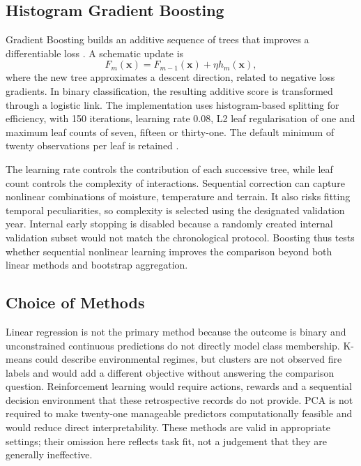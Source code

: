 \documentclass[conference,a4paper]{IEEEtran}
\begin{document}
\subsection{Histogram Gradient Boosting}
Gradient Boosting builds an additive sequence of trees that improves a differentiable loss \citep{friedman}. A schematic update is
\begin{equation}
F_m(\mathbf x)=F_{m-1}(\mathbf x)+\eta h_m(\mathbf x),
\end{equation}
where the new tree approximates a descent direction, related to negative loss gradients. In binary classification, the resulting additive score is transformed through a logistic link. The implementation uses histogram-based splitting for efficiency, with 150 iterations, learning rate 0.08, L2 leaf regularisation of one and maximum leaf counts of seven, fifteen or thirty-one. The default minimum of twenty observations per leaf is retained \citep{sklearnboost}.

The learning rate controls the contribution of each successive tree, while leaf count controls the complexity of interactions. Sequential correction can capture nonlinear combinations of moisture, temperature and terrain. It also risks fitting temporal peculiarities, so complexity is selected using the designated validation year. Internal early stopping is disabled because a randomly created internal validation subset would not match the chronological protocol. Boosting thus tests whether sequential nonlinear learning improves the comparison beyond both linear methods and bootstrap aggregation.

\subsection{Choice of Methods}
Linear regression is not the primary method because the outcome is binary and unconstrained continuous predictions do not directly model class membership. K-means could describe environmental regimes, but clusters are not observed fire labels and would add a different objective without answering the comparison question. Reinforcement learning would require actions, rewards and a sequential decision environment that these retrospective records do not provide. PCA is not required to make twenty-one manageable predictors computationally feasible and would reduce direct interpretability. These methods are valid in appropriate settings; their omission here reflects task fit, not a judgement that they are generally ineffective.
\end{document}
